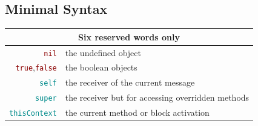 \documentclass[notumble]{leaflet}
\newcommand{\code}[1]{\foreignlanguage{english}{\texttt{#1}}}
\begin{document}

\vspace{-0.3cm}
\subsection{Minimal Syntax}
\noindent
\begin{tabularx}{\linewidth}{@{}rX@{}}
        \toprule
        \multicolumn{2}{c}{Six reserved words only}\\
        \midrule
        \textcolor{darkRed}{\code{nil}} & the undefined object\\
        \textcolor{darkRed}{\code{true}},\textcolor{darkRed}{\code{false}} & the boolean objects\\
        \textcolor{darkCyan}{\code{self}} &the receiver of the current message\\
        \textcolor{darkCyan}{\code{super}} &the receiver but for accessing overridden methods\\
        \textcolor{darkCyan}{\code{thisContext}} &the current method or block activation\\
\end{tabularx}
\end{document}
